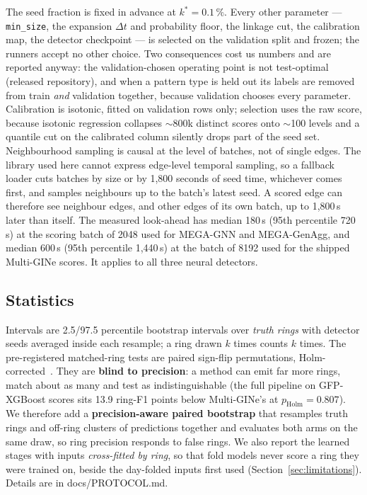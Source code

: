 The seed fraction is fixed in advance at $k^{*}=0.1\,\%$. Every other parameter --- \texttt{min\_size}, the expansion $\Delta t$
and probability floor, the linkage cut, the calibration map, the detector checkpoint --- is
selected on the validation split and frozen; the runners accept no other choice.
Two consequences cost us numbers and are reported anyway: the validation-chosen operating
point is not test-optimal (released repository), and when a pattern type is held out
its labels are removed from train \emph{and} validation together, because validation chooses
every parameter. Calibration is isotonic, fitted on validation rows only; selection uses the
raw score, because isotonic regression collapses $\sim$800k distinct scores onto $\sim$100
levels and a quantile cut on the calibrated column silently drops part of the seed set.
Neighbourhood sampling is causal at the level of batches, not of single edges. The library
used here cannot express edge-level temporal sampling, so a fallback loader cuts batches by size
or by 1{,}800 seconds of seed time, whichever comes first, and samples neighbours up to the
batch's latest seed. A scored edge can therefore see neighbour edges, and other edges of its own
batch, up to 1{,}800\,s later than itself. The measured look-ahead has median 180\,s (95th
percentile 720\,s) at the scoring batch of 2048 used for MEGA-GNN and MEGA-GenAgg, and median
600\,s (95th percentile 1{,}440\,s) at the batch of 8192 used for the shipped Multi-GINe scores.
It applies to all three neural detectors.

\subsection{Statistics}
\label{sec:data-stats}

Intervals are 2.5/97.5 percentile bootstrap intervals over \emph{truth rings} with detector seeds
averaged inside each resample; a ring drawn $k$ times counts $k$ times. The pre-registered matched-ring tests are paired
sign-flip permutations, Holm-corrected~\citep{holm1979}. They are \textbf{blind to precision}: a
method can emit far more rings, match about as many and test as indistinguishable (the full
pipeline on GFP-XGBoost scores sits 13.9 ring-F1 points below Multi-GINe's at
$p_{\mathrm{Holm}}=0.807$). We therefore add a \textbf{precision-aware paired bootstrap} that
resamples truth rings and off-ring clusters of predictions together and evaluates both arms on
the same draw, so ring precision responds to false rings. We also report the learned stages
with inputs \emph{cross-fitted by ring}, so that fold models never score a ring they were trained
on, beside the day-folded inputs first used (Section~\ref{sec:limitations}). Details are in docs/PROTOCOL.md.


